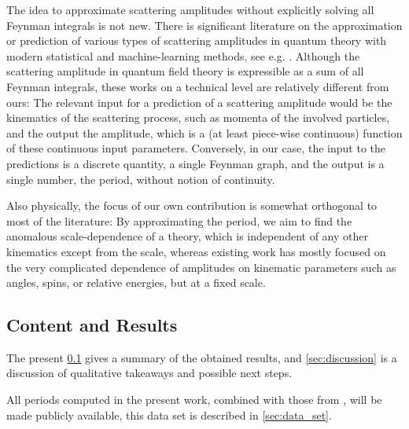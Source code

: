 \documentclass[12pt]{article}
\numberwithin{equation}{section}
\begin{document}
The idea to approximate scattering amplitudes without explicitly solving all Feynman integrals is not new.
There is significant literature on the approximation or prediction of various types of scattering amplitudes in quantum theory with modern statistical and machine-learning methods, see e.g. \cite{badger_using_2020,maitre_factorisationaware_2021,badger_loop_2023,ilten_modeling_2023,chahrour_comparing_2022,mizera_scattering_2023,maitre_oneloop_2023}.
Although the scattering amplitude in quantum field theory is expressible as a sum of all Feynman integrals, these works on a technical level are relatively different from ours:    The relevant input for a prediction of a scattering amplitude would be the kinematics of the scattering process, such as   momenta of the involved particles, and the output the amplitude, which is a (at least piece-wise continuous) function of these continuous input parameters. Conversely, in our case, the input to the predictions is a discrete quantity, a single Feynman graph, and the output is a single number, the period,  without notion of continuity.

Also physically, the focus of our own contribution is somewhat orthogonal to most of the literature: By approximating the period, we aim to find the anomalous scale-dependence of a theory, which is independent of any other kinematics except from the scale, whereas existing work has mostly focused on the very complicated dependence of amplitudes on kinematic parameters such as angles, spins, or relative energies, but at a fixed scale. 







\subsection{Content and Results}\label{sec:results}
The present \cref{sec:results} gives a summary of the obtained results, and
\cref{sec:discussion} is a discussion of qualitative takeaways and possible next steps.

All periods computed in the present work, combined with those from \cite{balduf_statistics_2023},   will be made publicly available, this data set is described in \cref{sec:data_set}.  
\end{document}
